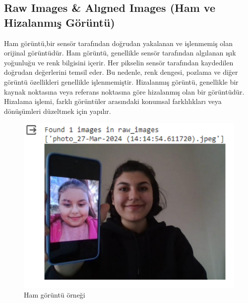 \documentclass[12pt]{article}
\begin{document}
\subsection{Raw Images & Alıgned Images (Ham ve Hizalanmış Görüntü)}
Ham görüntü,bir sensör tarafından doğrudan yakalanan ve işlenmemiş olan orijinal görüntüdür. Ham görüntü, genellikle sensör tarafından algılanan ışık yoğunluğu ve renk bilgisini içerir. Her pikselin sensör tarafından kaydedilen doğrudan değerlerini temsil eder. Bu nedenle, renk dengesi, pozlama ve diğer görüntü özellikleri genellikle işlenmemiştir.
Hizalanmış görüntü, genellikle bir kaynak noktasına veya referans noktasına göre hizalanmış olan bir görüntüdür. Hizalama işlemi, farklı görüntüler arasındaki konumsal farklılıkları veya dönüşümleri düzeltmek için yapılır.
\begin{figure}[h]
    \centering
    \begin{minipage}{0.45\textwidth}
        \centering
        \includegraphics[width=\textwidth]{raw.png} 
        \caption{Ham görüntü örneği}
        \label{fig:resim1}
    \end{minipage}\hfill
    \begin{minipage}{0.45\textwidth}
        \centering

\end{minipage}
\end{figure}
\end{document}
